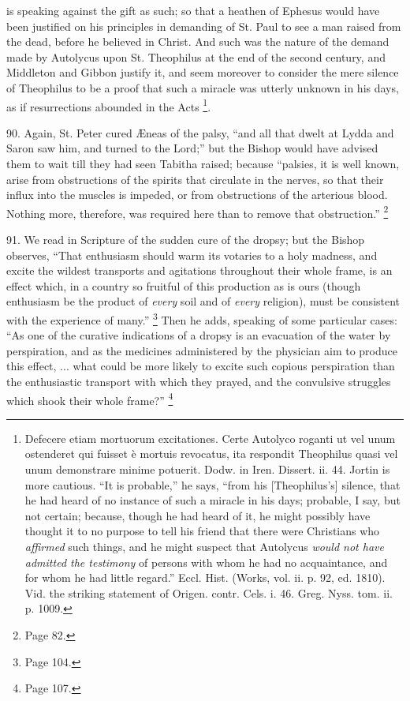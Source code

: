 is speaking against the gift as such; so that a heathen of Ephesus
would have been justified on his principles in demanding of St. Paul
to see a man raised from the dead, before he believed in Christ. And
such was the nature of the demand made by Autolycus upon St.
Theophilus at the end of the second century, and Middleton and Gibbon
justify it, and seem moreover to consider the mere silence of
Theophilus to be a proof that such a miracle was utterly unknown in
his days, as if resurrections abounded in the Acts \footnote{Defecere etiam mortuorum excitationes. Certe Autolyco roganti ut vel
unum ostenderet qui fuisset è mortuis revocatus, ita respondit
Theophilus quasi vel unum demonstrare minime potuerit. Dodw. in Iren.
Dissert. ii. 44. Jortin is more cautious. ``It is probable,'' he says, ``from
his [Theophilus's] silence, that he had heard of no instance of such a
miracle in his days; probable, I say, but not certain; because, though
he had heard of it, he might possibly have thought it to no purpose to
tell his friend that there were Christians who \emph{affirmed} such
things, and he might suspect that Autolycus \emph{would not have admitted
the testimony} of persons with whom he had no acquaintance, and for
whom he had little regard.'' Eccl. Hist. (Works, vol. ii. p. 92, ed.
1810). Vid. the striking statement of Origen. contr. Cels. i. 46.
Greg. Nyss. tom. ii. p. 1009.}.

90.
Again, St. Peter cured Æneas of the palsy, ``and all that dwelt
at Lydda and Saron saw him, and turned to the Lord;'' but the Bishop
would have advised them to wait till they had seen Tabitha
raised; because ``palsies, it is well known, arise from obstructions of
the spirits that circulate in the nerves, so that their influx into
the muscles is impeded, or from obstructions of the arterious blood.
Nothing more, therefore, was required here than to remove that
obstruction.'' \footnote{Page 82.}

91.
We read in Scripture of the sudden cure of the dropsy; but the Bishop
observes, ``That enthusiasm should warm its votaries to a holy madness,
and excite the wildest transports and agitations throughout their
whole frame, is an effect which, in a country so fruitful of this
production as is ours (though enthusiasm be the product of \emph{every}
soil and of \emph{every} religion), must be consistent with the
experience of many.'' \footnote{Page 104.}
Then he adds, speaking of some particular cases: ``As one of the
curative indications of a dropsy is an evacuation of the water by
perspiration, and as the medicines administered by the physician aim
to produce this effect, ... what could be more likely to excite
such copious perspiration than the enthusiastic transport with which
they prayed, and the convulsive struggles which shook their whole
frame?'' \footnote{Page 107.}

